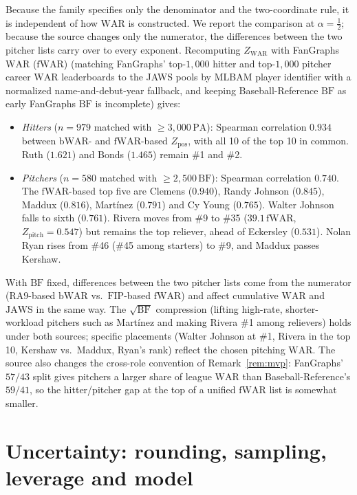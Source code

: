\documentclass[11pt,letterpaper]{article}
\theoremstyle{plain}
\theoremstyle{definition}
\theoremstyle{remark}
\newcommand{\WAR}{\mathrm{WAR}}
\newcommand{\PA}{\mathrm{PA}}
\newcommand{\BF}{\mathrm{BF}}
\newcommand{\JAWS}{\mathrm{JAWS}}
\newcommand{\ZWAR}{Z_{\WAR}}
\newcommand{\Zpos}{Z_{\mathrm{pos}}}
\newcommand{\Zpitch}{Z_{\mathrm{pitch}}}
\begin{document}
Because the family specifies only the denominator and the two-coordinate rule, it is independent of how $\WAR$ is constructed. We report the comparison at $\alpha = \tfrac12$; because the source changes only the numerator, the differences between the two pitcher lists carry over to every exponent. Recomputing $\ZWAR$ with FanGraphs $\WAR$ ($\mathrm{fWAR}$) \cite{fangraphs2026} (matching FanGraphs' top-$1{,}000$ hitter and top-$1{,}000$ pitcher career $\WAR$ leaderboards to the JAWS pools by MLBAM player identifier with a normalized name-and-debut-year fallback, and keeping Baseball-Reference $\BF$ as early FanGraphs $\BF$ is incomplete) gives:
\begin{itemize}
    \item \emph{Hitters} ($n = 979$ matched with $\ge 3{,}000\,\PA$): Spearman correlation $0.934$ between $\mathrm{bWAR}$- and $\mathrm{fWAR}$-based $\Zpos$, with all 10 of the top 10 in common. Ruth ($1.621$) and Bonds ($1.465$) remain \#1 and \#2.
    \item \emph{Pitchers} ($n = 580$ matched with $\ge 2{,}500\,\BF$): Spearman correlation $0.740$. The $\mathrm{fWAR}$-based top five are Clemens ($0.940$), Randy Johnson ($0.845$), Maddux ($0.816$), Mart\'{i}nez ($0.791$) and Cy Young ($0.765$). Walter Johnson falls to sixth ($0.761$). Rivera moves from \#9 to \#35 ($39.1\,\mathrm{fWAR}$, $\Zpitch = 0.547$) but remains the top reliever, ahead of Eckersley ($0.531$). Nolan Ryan rises from \#46 (\#45 among starters) to \#9, and Maddux passes Kershaw.
\end{itemize}
With $\BF$ fixed, differences between the two pitcher lists come from the numerator ($\mathrm{RA9}$-based $\mathrm{bWAR}$ vs.\ $\mathrm{FIP}$-based $\mathrm{fWAR}$) and affect cumulative $\WAR$ and $\JAWS$ in the same way. The $\sqrt{\BF}$ compression (lifting high-rate, shorter-workload pitchers such as Mart\'{i}nez and making Rivera \#1 among relievers) holds under both sources; specific placements (Walter Johnson at \#1, Rivera in the top 10, Kershaw vs.\ Maddux, Ryan's rank) reflect the chosen pitching $\WAR$. The source also changes the cross-role convention of Remark~\ref{rem:mvp}: FanGraphs' $57/43$ split gives pitchers a larger share of league $\WAR$ than Baseball-Reference's $59/41$, so the hitter/pitcher gap at the top of a unified $\mathrm{fWAR}$ list is somewhat smaller.

\section{Uncertainty: rounding, sampling, leverage and model}
\label{app:uncert}
\end{document}

